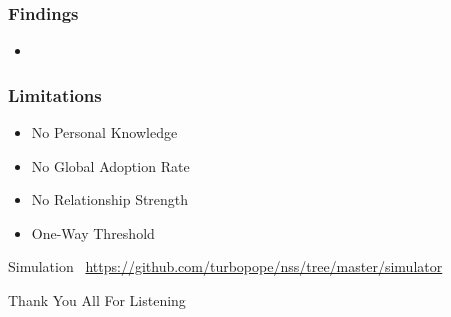 \documentclass[slidestop,usenames,dvipsnames]{beamer}
\newcommand{\fitem}{\pause\vfill\item}
\begin{document}


\begin{frame}
    \frametitle{Findings}
    \begin{itemize}
        \fitem
    \end{itemize}
    \vfill
\end{frame}

\begin{frame}
    \frametitle{Limitations}
    \begin{itemize}
        \fitem No Personal Knowledge
        \fitem No Global Adoption Rate
        \fitem No Relationship Strength
        \fitem One-Way Threshold
    \end{itemize}
    \vfill
\end{frame}

\begin{frame}
    \vfill
    \begin{center}
        {\Huge Simulation}\
        \vfill
        \url{https://github.com/turbopope/nss/tree/master/simulator}
    \end{center}
\end{frame}




\begin{frame}
    \vfill
    \begin{center}
        {\Huge Thank You All For Listening}\
    \end{center}
\end{frame}
\end{document}
